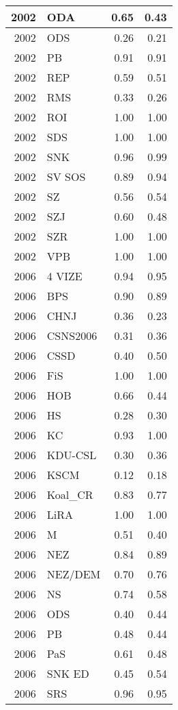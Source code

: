 \begin{tabular}{r|l|r|r}
\hline
2002 & ODA & 0.65 & 0.43\\
\hline
2002 & ODS & 0.26 & 0.21\\
\hline
2002 & PB & 0.91 & 0.91\\
\hline
2002 & REP & 0.59 & 0.51\\
\hline
2002 & RMS & 0.33 & 0.26\\
\hline
2002 & ROI & 1.00 & 1.00\\
\hline
2002 & SDS & 1.00 & 1.00\\
\hline
2002 & SNK & 0.96 & 0.99\\
\hline
2002 & SV SOS & 0.89 & 0.94\\
\hline
2002 & SZ & 0.56 & 0.54\\
\hline
2002 & SZJ & 0.60 & 0.48\\
\hline
2002 & SZR & 1.00 & 1.00\\
\hline
2002 & VPB & 1.00 & 1.00\\
\hline
2006 & 4 VIZE & 0.94 & 0.95\\
\hline
2006 & BPS & 0.90 & 0.89\\
\hline
2006 & CHNJ & 0.36 & 0.23\\
\hline
2006 & CSNS2006 & 0.31 & 0.36\\
\hline
2006 & CSSD & 0.40 & 0.50\\
\hline
2006 & FiS & 1.00 & 1.00\\
\hline
2006 & HOB & 0.66 & 0.44\\
\hline
2006 & HS & 0.28 & 0.30\\
\hline
2006 & KC & 0.93 & 1.00\\
\hline
2006 & KDU-CSL & 0.30 & 0.36\\
\hline
2006 & KSCM & 0.12 & 0.18\\
\hline
2006 & Koal\_CR & 0.83 & 0.77\\
\hline
2006 & LiRA & 1.00 & 1.00\\
\hline
2006 & M & 0.51 & 0.40\\
\hline
2006 & NEZ & 0.84 & 0.89\\
\hline
2006 & NEZ/DEM & 0.70 & 0.76\\
\hline
2006 & NS & 0.74 & 0.58\\
\hline
2006 & ODS & 0.40 & 0.44\\
\hline
2006 & PB & 0.48 & 0.44\\
\hline
2006 & PaS & 0.61 & 0.48\\
\hline
2006 & SNK ED & 0.45 & 0.54\\
\hline
2006 & SRS & 0.96 & 0.95\\

\end{tabular}
